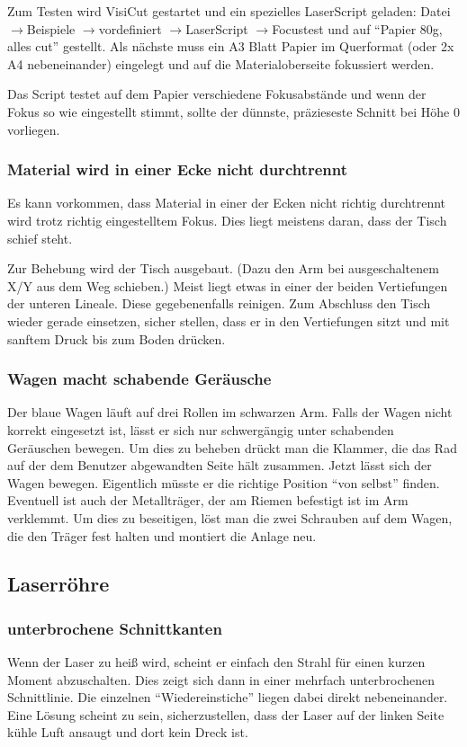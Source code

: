 \documentclass{\basedir/fablab-document}
\newcommand{\pfeil}{\ensuremath{\rightarrow}}
\begin{document}
Zum Testen wird VisiCut gestartet und ein spezielles LaserScript geladen: Datei \pfeil Beispiele \pfeil vordefiniert \pfeil LaserScript \pfeil Focustest und auf \enquote{Papier 80g, alles cut} gestellt.
Als nächste muss ein A3 Blatt Papier im Querformat (oder 2x A4 nebeneinander) eingelegt und auf die Materialoberseite fokussiert werden.

Das Script testet auf dem Papier verschiedene Fokusabstände und wenn der Fokus so wie eingestellt stimmt, sollte der dünnste, präzieseste Schnitt bei Höhe 0 vorliegen.


\subsubsection{Material wird in einer Ecke nicht durchtrennt}
Es kann vorkommen, dass Material in einer der Ecken nicht richtig durchtrennt wird trotz richtig eingestelltem Fokus. Dies liegt meistens daran, dass der Tisch schief steht.

Zur Behebung wird der Tisch ausgebaut. (Dazu den Arm bei ausgeschaltenem X/Y aus dem Weg schieben.) Meist liegt etwas in einer der beiden Vertiefungen der unteren Lineale. Diese gegebenenfalls reinigen. Zum Abschluss den Tisch wieder gerade einsetzen, sicher stellen, dass er in den Vertiefungen sitzt und mit sanftem Druck bis zum Boden drücken.

\subsubsection{Wagen macht schabende Geräusche}
Der blaue Wagen läuft auf drei Rollen im schwarzen Arm. Falls der Wagen nicht korrekt eingesetzt ist, lässt er sich nur schwergängig unter schabenden Geräuschen bewegen. Um dies zu beheben drückt man die Klammer, die das Rad auf der dem Benutzer abgewandten Seite hält zusammen. Jetzt lässt sich der Wagen bewegen. Eigentlich müsste er die richtige Position \enquote{von selbst} finden. Eventuell ist auch der Metallträger, der am Riemen befestigt ist im Arm verklemmt. Um dies zu beseitigen, löst man die zwei Schrauben auf dem Wagen, die den Träger fest halten und montiert die Anlage neu.

\subsection{Laserröhre}
\subsubsection{unterbrochene Schnittkanten}
Wenn der Laser zu heiß wird, scheint er einfach den Strahl für einen kurzen Moment abzuschalten. Dies zeigt sich dann in einer mehrfach unterbrochenen Schnittlinie. Die einzelnen \enquote{Wiedereinstiche} liegen dabei direkt nebeneinander. Eine Lösung scheint zu sein, sicherzustellen, dass der Laser auf der linken Seite kühle Luft ansaugt und dort kein Dreck ist.
\end{document}
